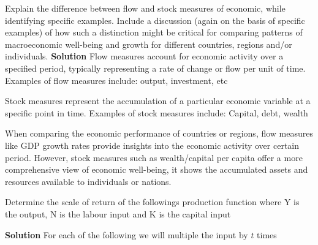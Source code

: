 \documentclass[addpoints,12pt,answers]{exam}
\begin{document}
	\vspace*{3em}
	
	
	\vspace*{3em}
	
	\begin{questions}
		

		\question Explain the difference between flow and stock measures of economic, while identifying specific examples. Include a discussion (again on the basis of specific examples) of how such a distinction might be critical for comparing patterns of macroeconomic well-being and growth for different countries, regions and/or individuals.
		\clearpage
		\textbf{Solution}
		Flow measures account for economic activity over a specified period, typically representing a rate of change or flow per unit of time. Examples of flow measures include: output, investment, etc
		
		Stock measures represent the accumulation of a particular economic variable at a specific point in time. Examples of stock measures include: Capital, debt, wealth
		
		When comparing the economic performance of countries or regions, flow measures like GDP growth rates provide insights into the economic activity over certain period. However, stock measures such as wealth/capital per capita offer a more comprehensive view of economic well-being, it shows the accumulated assets and resources available to individuals or nations.
		
		\clearpage
		\question  Determine the scale of return of the followings production function where Y is the output, N is the labour input and K is the capital input
		
		\clearpage
		\textbf{Solution}
		For each of the following we will multiple the input by $t$ times
		\begin{parts}

\end{parts}
\end{questions}
\end{document}
